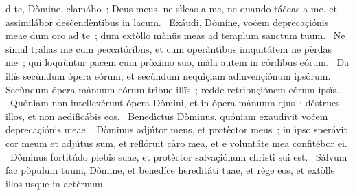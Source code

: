 { }
{%
d te, Dòmine, clamábo~; Deus meus, ne sìleas a me, ne quando táċeas a me, et assimilábor desċendèntibus in lacum. 
~Exáudi, Dòmine, voċem deprecaçiónis meae dum oro ad te~; dum extòllo mànüs meas ad templum sanctum tuum. 
~Ne sìmul trahas me cum peccatóribus, et cum operàntibus iniquitátem ne pèrdas me~; qui loquùntur paċem cum pròximo suo, màla autem in córdibus eórum. 
~Da illïs secùndum ópera eórum, et secùndum nequìçiam adinvençiónum ipsórum. Secùndum ópera mànuum eórum trìbue illïs~; redde retribuçiónem eórum ìpsïs. 
~Quóniam non intellexérunt ópera Dòmini, et in ópera mànuum ejus~; déstrues illos, et non aedificábis eos. 
~Benedìctus Dòminus, quóniam exaudívit voċem deprecaçiónis meae. 
~Dòminus adjútor meus, et protèctor meus~; in ìpso sperávit cor meum et adjútus sum, et reflóruit càro mea, et e voluntáte mea confitébor ei. 
~Dòminus fortitúdo plebis suae, et protèctor salvaçiónum christi sui est. 
~Sàlvum fac pòpulum tuum, Dòmine, et benedíce hereditáti tuae, et rège eos, et extòlle illos usque in aetèrnum. 
}

